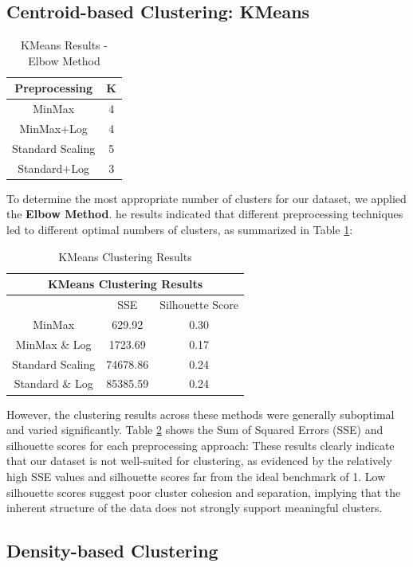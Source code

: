 \documentclass[10pt]{article}
\begin{document}
\subsection{Centroid-based Clustering: KMeans}

\begin{table}[ht!]
    \centering
    \begin{tabular}{|c|c|}
    \hline
    Preprocessing & K \\
    \hline
    MinMax & 4 \\
    MinMax+Log & 4 \\
    Standard Scaling & 5 \\
    Standard+Log & 3 \\
    \hline
    \end{tabular}
    \caption{KMeans Results - Elbow Method}
    \label{table:KM_K}
\end{table}
To determine the most appropriate number of clusters for our dataset, we applied the \textbf{Elbow Method}. he results indicated that different preprocessing techniques led to different optimal numbers of clusters, as summarized in Table \ref{table:KM_K}:
\begin{table}[ht!]
    \centering
    \begin{tabular}{|c|c|c|}
    \hline
    \multicolumn{3}{|c|}{KMeans Clustering Results} \\
    \hline
     & SSE & Silhouette Score \\
    \hline
    MinMax & 629.92 & 0.30 \\
    MinMax \& Log & 1723.69 & 0.17 \\
    Standard Scaling & 74678.86 & 0.24 \\
    Standard \& Log & 85385.59 & 0.24 \\
    \hline
    \end{tabular}
    \caption{KMeans Clustering Results}
    \label{table:KM}
\end{table}
However, the clustering results across these methods were generally suboptimal and varied significantly. Table \ref{table:KM} shows the Sum of Squared Errors (SSE) and silhouette scores for each preprocessing approach:
These results clearly indicate that our dataset is not well-suited for clustering, as evidenced by the relatively high SSE values and silhouette scores far from the ideal benchmark of 1. Low silhouette scores suggest poor cluster cohesion and separation, implying that the inherent structure of the data does not strongly support meaningful clusters.
\subsection{Density-based Clustering}
\end{document}
